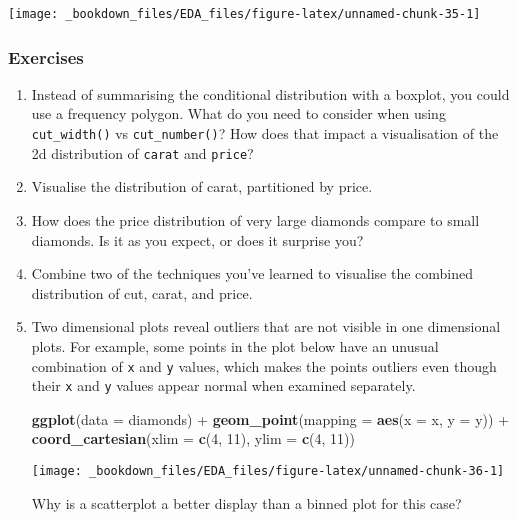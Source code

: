 \documentclass[]{book}
\newenvironment{Shaded}{\begin{snugshade}}{\end{snugshade}}
\newcommand{\KeywordTok}[1]{\textcolor[rgb]{0.13,0.29,0.53}{\textbf{{#1}}}}
\newcommand{\DataTypeTok}[1]{\textcolor[rgb]{0.13,0.29,0.53}{{#1}}}
\newcommand{\DecValTok}[1]{\textcolor[rgb]{0.00,0.00,0.81}{{#1}}}
\newcommand{\StringTok}[1]{\textcolor[rgb]{0.31,0.60,0.02}{{#1}}}
\newcommand{\NormalTok}[1]{{#1}}
\begin{document}
\begin{center}\texttt{[image: \_bookdown\_files/EDA\_files/figure-latex/unnamed-chunk-35-1]} \end{center}

\subsubsection{Exercises}\label{exercises-17}

\begin{enumerate}
\def\labelenumi{\arabic{enumi}.}
\item
  Instead of summarising the conditional distribution with a boxplot,
  you could use a frequency polygon. What do you need to consider when
  using \texttt{cut\_width()} vs \texttt{cut\_number()}? How does that
  impact a visualisation of the 2d distribution of \texttt{carat} and
  \texttt{price}?
\item
  Visualise the distribution of carat, partitioned by price.
\item
  How does the price distribution of very large diamonds compare to
  small diamonds. Is it as you expect, or does it surprise you?
\item
  Combine two of the techniques you've learned to visualise the combined
  distribution of cut, carat, and price.
\item
  Two dimensional plots reveal outliers that are not visible in one
  dimensional plots. For example, some points in the plot below have an
  unusual combination of \texttt{x} and \texttt{y} values, which makes
  the points outliers even though their \texttt{x} and \texttt{y} values
  appear normal when examined separately.

\begin{Shaded}
\begin{Highlighting}[]
\KeywordTok{ggplot}\NormalTok{(}\DataTypeTok{data =} \NormalTok{diamonds) +}
\StringTok{  }\KeywordTok{geom_point}\NormalTok{(}\DataTypeTok{mapping =} \KeywordTok{aes}\NormalTok{(}\DataTypeTok{x =} \NormalTok{x, }\DataTypeTok{y =} \NormalTok{y)) +}
\StringTok{  }\KeywordTok{coord_cartesian}\NormalTok{(}\DataTypeTok{xlim =} \KeywordTok{c}\NormalTok{(}\DecValTok{4}\NormalTok{, }\DecValTok{11}\NormalTok{), }\DataTypeTok{ylim =} \KeywordTok{c}\NormalTok{(}\DecValTok{4}\NormalTok{, }\DecValTok{11}\NormalTok{))}
\end{Highlighting}
\end{Shaded}

  \begin{center}\texttt{[image: \_bookdown\_files/EDA\_files/figure-latex/unnamed-chunk-36-1]} \end{center}

  Why is a scatterplot a better display than a binned plot for this
  case?
\end{enumerate}
\end{document}
